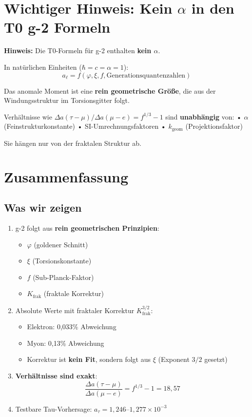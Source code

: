	\section{Wichtiger Hinweis: Kein $\alpha$ in den T0 g-2 Formeln}
	
	\textbf{Hinweis:}
	Die T0-Formeln für g-2 enthalten \textbf{kein $\alpha$}.
	
	In natürlichen Einheiten ($\hbar = c = \alpha = 1$):
	\[ a_\ell = f(\varphi, \xi, f, \text{Generationsquantenzahlen}) \]
	
	Das anomale Moment ist eine \textbf{rein geometrische Größe},
	die aus der Windungsstruktur im Torsionsgitter folgt.
	
	Verhältnisse wie $\Delta a(\tau-\mu)/\Delta a(\mu-e) = f^{1/3} - 1$ sind
	\textbf{unabhängig} von:
	• $\alpha$ (Feinstrukturkonstante)
	• SI-Umrechnungsfaktoren
	• $k_{\text{geom}}$ (Projektionsfaktor)
	
	Sie hängen nur von der fraktalen Struktur ab.
	\section{Zusammenfassung}
	
	\subsection{Was wir zeigen}
	
	\begin{enumerate}
		\item g-2 folgt aus \textbf{rein geometrischen Prinzipien}:
		\begin{itemize}
			\item $\varphi$ (goldener Schnitt)
			\item $\xi$ (Torsionskonstante)
			\item $f$ (Sub-Planck-Faktor)
			\item $K_\text{frak}$ (fraktale Korrektur)
		\end{itemize}
		
		\item Absolute Werte mit fraktaler Korrektur $K_\text{frak}^{3/2}$:
		\begin{itemize}
			\item Elektron: 0{,}033\% Abweichung
			\item Myon: 0{,}13\% Abweichung
			\item Korrektur ist \textbf{kein Fit}, sondern folgt aus $\xi$ (Exponent $3/2$ gesetzt)
		\end{itemize}
		
		\item \textbf{Verhältnisse sind exakt}:
		\begin{equation}
			\frac{\Delta a(\tau - \mu)}{\Delta a(\mu - e)} = f^{1/3} - 1 = 18{,}57
		\end{equation}
		
		\item Testbare Tau-Vorhersage: $a_\tau = 1{,}246$--$1{,}277 \times 10^{-3}$
	\end{enumerate}
	
